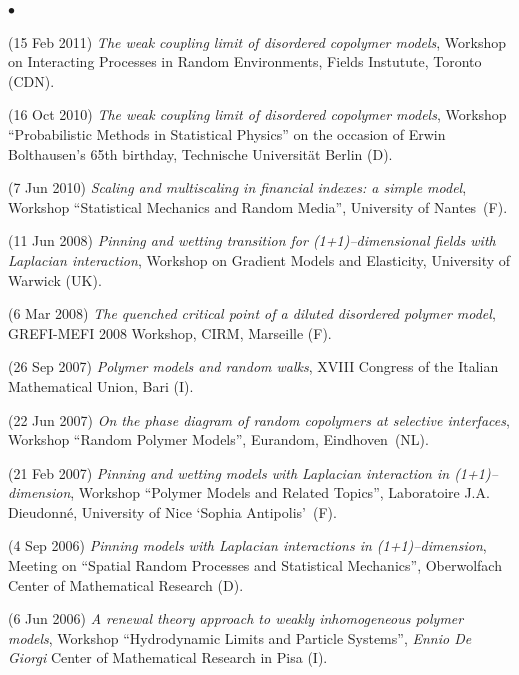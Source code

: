 \documentclass[a4paper,11pt,oneside]{amsart}
\newenvironment{myitemize}{%
\begin{list}{$\bullet$}%
 	{%
	\setlength{\itemsep}{0.3em}%
	\setlength{\topsep}{0.3em}%
	\setlength{\partopsep}{0em}%
	\setlength{\parsep}{0em}%
	\setlength{\parskip}{0em}%
	\setlength\leftmargin{1.5em}%
	\setlength\labelwidth{1.1em}%
	\setlength{\labelsep}{0.4em}%
	}%
	}%
{\end{list}}
\renewenvironment{itemize}{
\begin{myitemize}}%
{\end{myitemize}}
\begin{document}
\begin{itemize}
\item (15 Feb 2011)
\emph{The weak coupling limit of disordered copolymer models},
Workshop on Interacting Processes in Random Environments,
Fields Instutute, Toronto (CDN).

\item (16 Oct 2010)
\emph{The weak coupling limit of disordered copolymer models},
Workshop ``Probabilistic Methods in Statistical Physics''
on the occasion of Erwin Bolthausen's
65th birthday, Technische Universit\"at Berlin (D).


\item (7 Jun 2010)
\emph{Scaling and multiscaling in financial indexes: a simple model},
Workshop ``Statistical Mechanics and Random Media'',
University of Nantes~(F).

\item (11 Jun 2008)
\emph{Pinning and wetting transition for
(1+1)--dimensional fields with Laplacian interaction},
Workshop on Gradient Models and Elasticity, University of Warwick (UK).

\item (6 Mar 2008)
\emph{The quenched critical point of a diluted disordered polymer model},
GREFI-MEFI 2008 Workshop, CIRM, Marseille (F).

\item (26 Sep 2007)
\emph{Polymer models and random walks},
XVIII Congress of the Italian Mathematical Union, Bari (I).

\item (22 Jun 2007)
\emph{On the phase diagram of random copolymers at selective interfaces},
Workshop ``Random Polymer Models'',
Eurandom, Eindhoven~(NL).

\item (21 Feb 2007)
\emph{Pinning and wetting models with Laplacian interaction in (1+1)--di\-men\-sion},
Workshop ``Polymer Models and Related Topics'',
Laboratoire J.A. Dieudonn\'e, University of Nice `Sophia Antipolis'~(F).

\item (4 Sep 2006)
\emph{Pinning models with Laplacian interactions in (1+1)--dimension},
Meeting on ``Spatial Random Processes and Statistical Mechanics'',
Oberwolfach Center of Mathematical Research (D).

\item (6 Jun 2006)
\emph{A renewal theory approach to weakly inhomogeneous polymer models},
Workshop ``Hydrodynamic Limits and Particle Systems'',
\emph{Ennio De Giorgi} Center of Mathematical Research in Pisa (I).
\end{itemize}
\end{document}
